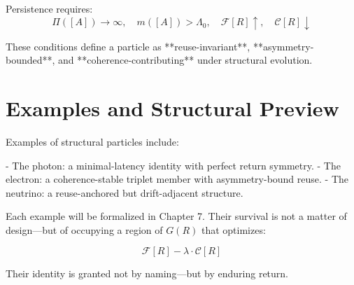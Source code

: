 Persistence requires:
\[
\Pi([A]) \to \infty,\quad m([A]) > \Lambda_0,\quad \mathcal{F}[R] \uparrow,\quad \mathcal{C}[R] \downarrow
\]

These conditions define a particle as **reuse-invariant**, **asymmetry-bounded**, and **coherence-contributing** under structural evolution.

\section{Examples and Structural Preview} \label{sec:particle-preview}

Examples of structural particles include:

- The photon: a minimal-latency identity with perfect return symmetry.
- The electron: a coherence-stable triplet member with asymmetry-bound reuse.
- The neutrino: a reuse-anchored but drift-adjacent structure.

Each example will be formalized in Chapter 7. Their survival is not a matter of design—but of occupying a region of $G(R)$ that optimizes:

\[
\mathcal{F}[R] - \lambda \cdot \mathcal{C}[R]
\]

Their identity is granted not by naming—but by enduring return.
